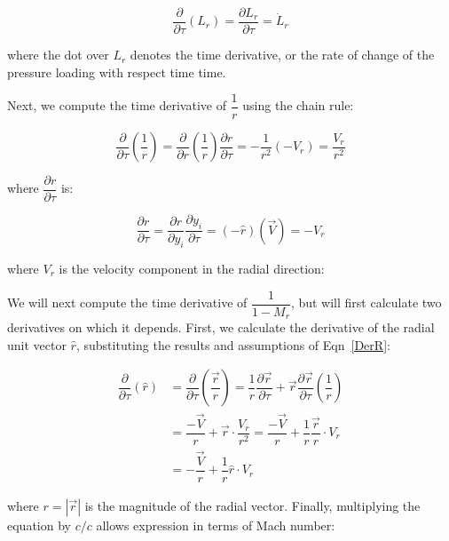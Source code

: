 \documentclass[]{aiaa-tc}%
\begin{document}
\begin{equation} \label{DerL}
\dfrac{\partial}{\partial\tau} \left( L_r \right)
    = \dfrac{\partial L_r}{\partial\tau}
    = \dot{L}_r
\end{equation}

\noindent where the dot over $L_r$ denotes the time derivative, or the rate of change of the pressure loading with respect time time.

Next, we compute the time derivative of $\dfrac{1}{r}$ using the chain rule:

\begin{equation} \label{DerR}
\dfrac{\partial}{\partial\tau} \left( \dfrac{1}{r} \right)
= \dfrac{\partial}{\partial r} \left( \dfrac{1}{r} \right)
    \dfrac{\partial r}{\partial\tau}
= -\dfrac{1}{r^2} (-V_r)
= \dfrac{V_r}{r^2}
\end{equation}

\noindent where $\dfrac{\partial r}{\partial\tau}$ is:

\begin{equation} \label{drdtau}
\dfrac{\partial r}{\partial\tau}
= \dfrac{\partial r}{\partial y_i}\dfrac{\partial y_i}{\partial\tau}
= (-\hat{r})(\vec{V})
= -V_r
\end{equation}

\noindent where $V_r$ is the velocity component in the radial direction:

We will next compute the time derivative of $\dfrac{1}{1 - M_r}$, but will first calculate two derivatives on which it depends.  First, we calculate the derivative of the radial unit vector $\hat{r}$, substituting the results and assumptions of Eqn~\ref{DerR}:

\begin{align*}
\dfrac{\partial}{\partial\tau} \left( \hat{r} \right)
&= \dfrac{\partial}{\partial\tau} \left( \dfrac{\vec{r}}{r} \right)
    = \dfrac{1}{r} \dfrac{\partial \vec{r}}{\partial\tau}
    + \vec{r}\dfrac{\partial\vec{r}}{\partial\tau} \left(\dfrac{1}{r} \right)\\
&= \dfrac{-\vec{V}}{r} + \vec{r} \cdot \dfrac{V_r}{r^2}
    = \dfrac{-\vec{V}}{r} + \dfrac{1}{r} \dfrac{\vec{r}}{r} \cdot V_r \\
&= -\dfrac{\vec{V}}{r} + \dfrac{1}{r} \hat{r} \cdot V_r
\end{align*}

\noindent where $r = |\vec{r}|$ is the magnitude of the radial vector.  Finally, multiplying the equation by $c/c$ allows expression in terms of Mach number:
\end{document}
